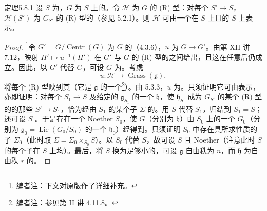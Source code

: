 \begin{SGAresult}{定理}{5.8.1}
设 $S$ 为，$G$ 为 $S$ 上的。令 $\mathcal H$ 为 $G$ 的 (R) 型：对每个 $S'\to S$，$\mathcal H(S')$ 为 $G_{S'}$ 的 (R) 型的（参见 5.2.1）。则 $\mathcal H$ 可由一个在 $S$ 上且的 $S$ 上表示。
\end{SGAresult}
\begin{proof}
\footnote{编者注：下文对原版作了详细补充。}令 $G'=G/\operatorname{Centr}(G)$ 为 $G$ 的（4.3.6），$u$ 为 $G\to G'$。由第 XII 讲 7.12，映射 $H'\mapsto u^{-1}(H')$ 在 $G'$ 与 $G$ 的 (R) 型的之间给出，且这在任意后仍成立。因此，以 $G'$ 代替 $G$，可设 $G$ 为。考虑
\[u:\mathcal H\longrightarrow\operatorname{Grass}(\mathfrak g),\]
将每个 (R) 型映到其（它是 $\mathfrak g$ 的一个\footnote{编者注：参见第 II 讲 4.11.8。}）。由 5.3.3，$u$ 为。只须证明它可由表示，亦即证明：对每个 $S_1\to S$ 及给定的 $\mathfrak g_{S_1}$ 的一个 $\mathfrak h$，使 $\mathfrak h_{S'}$ 成为 $G_{S'}$ 的某个 (R) 型的的那些 $S'\to S_1$，恰为经由 $S_1$ 的某个子 $\Sigma$ 的。用 $S$ 代替 $S_1$，归结到 $S_1=S$；还可设 $S$ 。于是存在一个 Noether  $S_0$，使 $G$（分别为 $\mathfrak h$）由 $S_0$ 上的一个 $G_0$（分别为 $\mathfrak g_0=\operatorname{Lie}(G_0/S_0)$ 的一个 $\mathfrak h_0$）经得到。只须证明 $S_0$ 中存在具所求性质的子 $\Sigma_0$（此时取 $\Sigma=\Sigma_0\times_{S_0}S$）。以 $S_0$ 代替 $S$，故可设 $S$ 且 Noether（注意此时 $S$ 的每个子在 $S$ 上均）。最后，将 $S$ 换为足够小的，可设 $\mathfrak g$ 自由秩为 $n$，而 $\mathfrak h$ 为自由秩 $r$ 的。

\end{proof}
